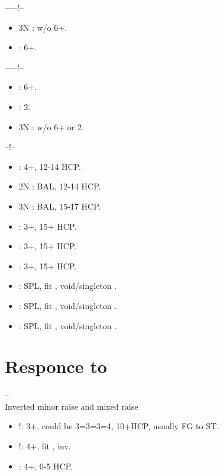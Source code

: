 \documentclass[12pt,twoside,a5paper]{report}%
\begin{document}
	------!--
	\begin{itemize}
	\renewcommand{\labelitemi}{}
	\item 3N : w/o  6+\cl{}.
	\item {} : 6+\cl{}.
	\end{itemize}

	------!--
	\begin{itemize}
	\renewcommand{\labelitemi}{}
	\item {} : 6+\cl{}.
	\item {} : 2\di{}.
	\item 3N : w/o  6+\cl{} or 2\di{}.
	\end{itemize}

	--!--
	\begin{itemize}
	\renewcommand{\labelitemi}{}
	\item {} : 4+\cl{}, 12-14 HCP.
	\item 2N : BAL, 12-14 HCP.
	\item 3N : BAL, 15-17 HCP.
	\item {} : 3+\di{}, 15+ HCP.
	\item {} : 3+\he{}, 15+ HCP.
	\item {} : 3+\sp{}, 15+ HCP.
	\item {} : SPL, fit \cl{}, void/singleton \di{}.
	\item {} : SPL, fit \cl{}, void/singleton \he{}.
	\item {} : SPL, fit \cl{}, void/singleton \sp{}.
	\end{itemize}
	

\chapter*{Responce to }
	-- \\

	Inverted minor raise and mixed raise
	\begin{itemize}
	\renewcommand{\labelitemi}{}
	\item {}!: 3+\di{}, could be 3=3=3=4, 10+HCP, usually FG to ST. 
	\item {}!: 4+\di{}, fit \di{}, inv.  
	\item {} : 4+\di{}, 0-5 HCP. 
	\end{itemize}
\end{document}
